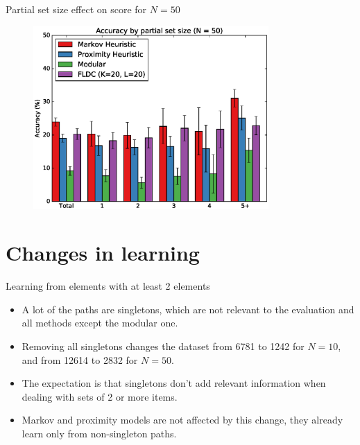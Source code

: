 \documentclass{beamer}
\begin{document}
\begin{frame}{Partial set size effect on score for $N=50$}
  \begin{figure}
    \centering
    \includegraphics[width=0.8\textwidth]{set_size_score_50}
  \end{figure}
\end{frame}

\section{Changes in learning}

\begin{frame}{Learning from elements with at least 2 elements}
  \begin{itemize}
    \item A lot of the paths are singletons, which are not relevant to the evaluation and all methods except the modular one.
    \item Removing all singletons changes the dataset from 6781 to 1242 for $N=10$, and from 12614 to 2832 for $N=50$.
    \item The expectation is that singletons don't add relevant information when dealing with sets of 2 or more items.
    \item Markov and proximity models are not affected by this change, they already learn only from non-singleton paths.
  \end{itemize}
\end{frame}
\end{document}
